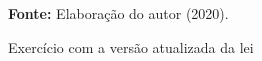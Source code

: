\begin{figure}[ht!]
\centering

\caption{\textmd{Exercício com a versão atualizada da lei}}
\label{fig:ndevesp}

\par\medskip\textbf{Fonte:} Elaboração do autor (2020). \par\medskip

\end{figure}

